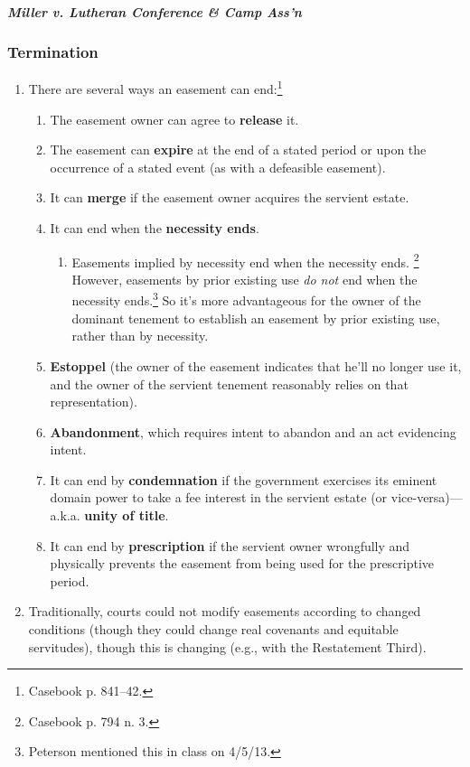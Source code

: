 \paragraph{\emph{Miller v. Lutheran Conference \& Camp Ass'n}}

\subsubsection{Termination}

\begin{enumerate}
    \item There are several ways an easement can end:\footnote{Casebook p. 
    841--42.}
    \begin{enumerate}
        \item The easement owner can agree to \textbf{release} it.
        \item The easement can \textbf{expire} at the end of a stated period 
        or upon the occurrence of a stated event (as with a defeasible 
        easement).
        \item It can \textbf{merge} if the easement owner acquires the 
        servient estate.
        \item It can end when the \textbf{necessity ends}.
        \begin{enumerate}
            \item Easements implied by necessity end when the necessity 
            ends. \footnote{Casebook p. 794 n. 3.} However, easements by prior 
            existing use \emph{do not} end when the necessity 
            ends.\footnote{Peterson mentioned this in class on 4/5/13.} So 
            it's more advantageous for the owner of the dominant tenement to 
            establish an easement by prior existing use, rather than by 
            necessity.
        \end{enumerate}
        \item \textbf{Estoppel} (the owner of the easement indicates that 
        he'll no longer use it, and the owner of the servient tenement 
        reasonably relies on that representation).
        \item \textbf{Abandonment}, which requires intent to abandon and an 
        act evidencing intent.
        \item It can end by \textbf{condemnation} if the government exercises 
        its eminent domain power to take a fee interest in the servient 
        estate (or vice-versa)---a.k.a. \textbf{unity of title}.
        \item It can end by \textbf{prescription} if the servient owner 
        wrongfully and physically prevents the easement from being used for 
        the prescriptive period.
    \end{enumerate}
    \item Traditionally, courts could not modify easements according to 
    changed conditions (though they could change real covenants and equitable 
    servitudes), though this is changing (e.g., with the Restatement Third).
\end{enumerate}

